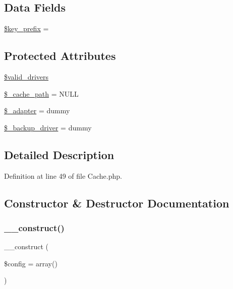 \subsection*{Data Fields}
\begin{DoxyCompactItemize}
\item 
\mbox{\hyperlink{class_c_i___cache_ac5ae5bfe56bac385a2687d7503487f38}{\$key\+\_\+prefix}} = \textquotesingle{}\textquotesingle{}
\end{DoxyCompactItemize}
\subsection*{Protected Attributes}
\begin{DoxyCompactItemize}
\item 
\mbox{\hyperlink{class_c_i___cache_a32d963b3d49fd67f188c1a74d38be6df}{\$valid\+\_\+drivers}}
\item 
\mbox{\hyperlink{class_c_i___cache_ae9407d6ae1ddd132cca3c7f855f89dfe}{\$\+\_\+cache\+\_\+path}} = N\+U\+LL
\item 
\mbox{\hyperlink{class_c_i___cache_a465f293474a3bbb7341af052f7de13d7}{\$\+\_\+adapter}} = \textquotesingle{}dummy\textquotesingle{}
\item 
\mbox{\hyperlink{class_c_i___cache_a6e11e902e473d1345a4caa11236ac828}{\$\+\_\+backup\+\_\+driver}} = \textquotesingle{}dummy\textquotesingle{}
\end{DoxyCompactItemize}


\subsection{Detailed Description}


Definition at line 49 of file Cache.\+php.



\subsection{Constructor \& Destructor Documentation}
\mbox{\label{class_c_i___cache_af7f9493844d2d66e924e3c1df51ce616}} 
\subsubsection{\texorpdfstring{\_\_construct()}{\_\_construct()}}
{\footnotesize\ttfamily \+\_\+\+\_\+construct (\begin{DoxyParamCaption}\item[{}]{\$config = {\ttfamily array()} }\end{DoxyParamCaption})}

